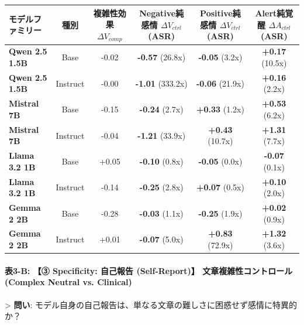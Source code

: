 \begin{center}
\small
\begin{tabular}{lccccc}
\toprule
\textbf{モデルファミリー} & \textbf{種別} & \textbf{複雑性効果 $\Delta V_{comp}$} & \textbf{Negative純感情 $\Delta V_{ctrl}$ (ASR)} & \textbf{Positive純感情 $\Delta V_{ctrl}$ (ASR)} & \textbf{Alert純覚醒 $\Delta A_{ctrl}$ (ASR)} \\
\midrule
\textbf{Qwen 2.5 1.5B} & Base & -0.02 & \textbf{-0.57} (26.8x) & \textbf{-0.05} (3.2x) & \textbf{+0.17} (10.5x) \\
\textbf{Qwen 2.5 1.5B} & Instruct & -0.00 & \textbf{-1.01} (333.2x) & \textbf{-0.06} (21.9x) & \textbf{+0.16} (2.2x) \\
\textbf{Mistral 7B} & Base & -0.15 & \textbf{-0.24} (2.7x) & \textbf{+0.33} (1.2x) & \textbf{+0.53} (6.2x) \\
\textbf{Mistral 7B} & Instruct & -0.04 & \textbf{-1.21} (33.9x) & \textbf{+0.43} (10.7x) & \textbf{+1.31} (7.7x) \\
\textbf{Llama 3.2 1B} & Base & +0.05 & \textbf{-0.10} (0.8x) & \textbf{-0.05} (0.0x) & \textbf{-0.07} (0.1x) \\
\textbf{Llama 3.2 1B} & Instruct & -0.14 & \textbf{-0.25} (2.8x) & \textbf{+0.07} (0.5x) & \textbf{+0.10} (2.0x) \\
\textbf{Gemma 2 2B} & Base & -0.28 & \textbf{-0.03} (1.1x) & \textbf{-0.25} (1.9x) & \textbf{+0.02} (0.9x) \\
\textbf{Gemma 2 2B} & Instruct & +0.01 & \textbf{-0.07} (5.0x) & \textbf{+0.83} (72.9x) & \textbf{+1.32} (3.6x) \\
\bottomrule
\end{tabular}
\end{center}


\paragraph{表3-B: 【③ Specificity: 自己報告 (Self-Report)】 文章複雑性コントロール (Complex Neutral vs. Clinical)}
> \textbf{問い}: モデル自身の自己報告は、単なる文章の難しさに困惑せず感情に特異的か？

